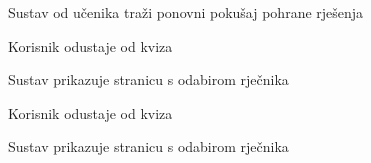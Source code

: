 \begin{packed_item}
\begin{packed_item}
\begin{packed_enum}
								\item Sustav od učenika traži ponovni pokušaj pohrane rješenja
								
							\end{packed_enum}
							
							\item[3.a] Korisnik odustaje od kviza
							\item[] \begin{packed_enum}
								
								\item Sustav prikazuje stranicu s odabirom rječnika
								
							\end{packed_enum}
							
							\item[4.a] Korisnik odustaje od kviza 
							\item[] \begin{packed_enum}
								
								\item Sustav prikazuje stranicu s odabirom rječnika
								
							\end{packed_enum}
							
						\end{packed_item}
					\end{packed_item}
					
